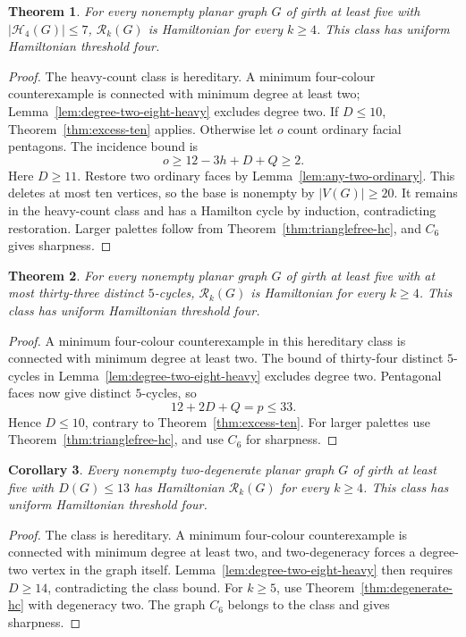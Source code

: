 \documentclass[11pt]{article}
\newtheorem{theorem}{Theorem}[section]
\newtheorem{corollary}[theorem]{Corollary}
\theoremstyle{remark}
\newcommand{\Rk}{\mathcal R_k}
\numberwithin{equation}{section}
\numberwithin{table}{section}
\begin{document}
\begin{theorem}\label{thm:seven-heavy}
For every nonempty planar graph $G$ of girth at least five with
$|\mathcal H_4(G)|\le7$, $\Rk(G)$ is Hamiltonian for every $k\ge4$.
This class has uniform Hamiltonian threshold four.
\end{theorem}
\begin{proof}
The heavy-count class is hereditary. A minimum four-colour
counterexample is connected with minimum degree at least two;
Lemma~\ref{lem:degree-two-eight-heavy} excludes degree two.
If $D\le10$, Theorem~\ref{thm:excess-ten} applies. Otherwise let
$o$ count ordinary facial pentagons. The incidence bound is
\[
 o\ge12-3h+D+Q\ge2.
\]
Here $D\ge11$. Restore two ordinary faces by
Lemma~\ref{lem:any-two-ordinary}. This deletes at most ten vertices, so the base is nonempty by $|V(G)|\ge20$.
It remains in the heavy-count class and has a Hamilton cycle by
induction, contradicting restoration. Larger palettes follow from
Theorem~\ref{thm:trianglefree-hc}, and $C_6$ gives sharpness.
\end{proof}

\begin{theorem}\label{thm:thirty-three-pentagons}
For every nonempty planar graph $G$ of girth at least five with at
most thirty-three distinct $5$-cycles, $\Rk(G)$ is Hamiltonian for
every $k\ge4$. This class has uniform Hamiltonian threshold four.
\end{theorem}
\begin{proof}
A minimum four-colour counterexample in this hereditary class is
connected with minimum degree at least two. The bound of thirty-four
distinct $5$-cycles in Lemma~\ref{lem:degree-two-eight-heavy} excludes
degree two.
Pentagonal faces now give distinct $5$-cycles, so
\[
 12+2D+Q=p\le33.
\]
Hence $D\le10$, contrary to Theorem~\ref{thm:excess-ten}.
For larger palettes use Theorem~\ref{thm:trianglefree-hc}, and use
$C_6$ for sharpness.
\end{proof}

\begin{corollary}\label{cor:two-degenerate-excess-thirteen}
Every nonempty two-degenerate planar graph $G$ of girth at least five
with $D(G)\le13$ has Hamiltonian $\Rk(G)$ for every $k\ge4$.
This class has uniform Hamiltonian threshold four.
\end{corollary}
\begin{proof}
The class is hereditary. A minimum four-colour counterexample
is connected with minimum degree at least two, and two-degeneracy
forces a degree-two vertex in the graph itself.
Lemma~\ref{lem:degree-two-eight-heavy} then requires
$D\ge14$, contradicting the class bound. For $k\ge5$, use
Theorem~\ref{thm:degenerate-hc} with degeneracy two. The graph $C_6$
belongs to the class and gives sharpness.
\end{proof}
\end{document}
